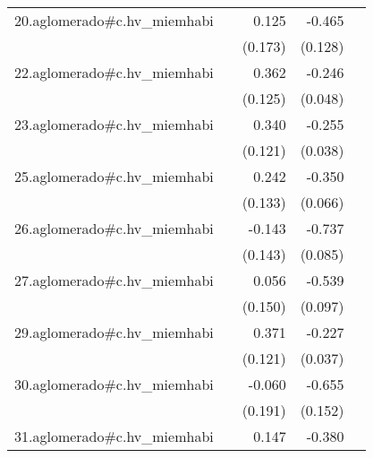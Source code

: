 {\begin{longtable}{l*{4}{D{.}{.}{-1}}}
\addlinespace
20.aglomerado#c.hv\_miemhabi&                     &       0.125         &      -0.465\sym{***}&                     \\
            &                     &     (0.173)         &     (0.128)         &                     \\
\addlinespace
22.aglomerado#c.hv\_miemhabi&                     &       0.362\sym{**} &      -0.246\sym{***}&                     \\
            &                     &     (0.125)         &     (0.048)         &                     \\
\addlinespace
23.aglomerado#c.hv\_miemhabi&                     &       0.340\sym{**} &      -0.255\sym{***}&                     \\
            &                     &     (0.121)         &     (0.038)         &                     \\
\addlinespace
25.aglomerado#c.hv\_miemhabi&                     &       0.242         &      -0.350\sym{***}&                     \\
            &                     &     (0.133)         &     (0.066)         &                     \\
\addlinespace
26.aglomerado#c.hv\_miemhabi&                     &      -0.143         &      -0.737\sym{***}&                     \\
            &                     &     (0.143)         &     (0.085)         &                     \\
\addlinespace
27.aglomerado#c.hv\_miemhabi&                     &       0.056         &      -0.539\sym{***}&                     \\
            &                     &     (0.150)         &     (0.097)         &                     \\
\addlinespace
29.aglomerado#c.hv\_miemhabi&                     &       0.371\sym{**} &      -0.227\sym{***}&                     \\
            &                     &     (0.121)         &     (0.037)         &                     \\
\addlinespace
30.aglomerado#c.hv\_miemhabi&                     &      -0.060         &      -0.655\sym{***}&                     \\
            &                     &     (0.191)         &     (0.152)         &                     \\
\addlinespace
31.aglomerado#c.hv\_miemhabi&                     &       0.147         &      -0.380\sym{***}&                     \\

\end{longtable}}
